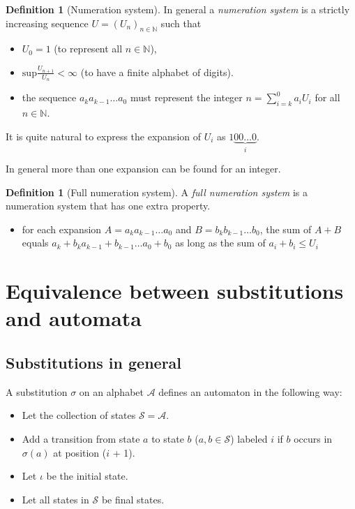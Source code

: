 \documentclass{article}
\theoremstyle{definition}
\newtheorem{definition}[theorem]{Definition}
\begin{document}
\begin{definition}[Numeration system] \label{def:numeration_system}
In general a \emph{numeration system} is a strictly increasing sequence 
$U = (U_n)_{n \in \mathbb{N}}$ such that
\begin{itemize}
\item $U_0 = 1$ (to represent all $n \in \mathbb{N}$),
\item $\mathrm{sup}\frac{U_{n + 1}}{U_n} < \infty$ (to have a finite alphabet 
      of digits).
\item the sequence $a_k a_{k - 1} \ldots a_0$ must represent the integer
$n = \sum_{i = k}^0 a_i U_i$ for all $n \in \mathbb{N}$.
\end{itemize}
\end{definition}

It is quite natural to express the expansion of $U_i$ as
$1\underbrace{00\ldots0}_i$. 

In general more than one expansion can be found for an integer.

\begin{definition}[Full numeration system] \label{def:full_numeration_system}
A \emph{full numeration system} is a numeration system that has one extra
property. 
\begin{itemize}
\item for each expansion $A = a_k a_{k - 1} \ldots a_0$ and 
$B = b_k b_{k - 1} \ldots b_0$, the sum of $A + B$ equals 
$a_k + b_k a_{k - 1} + b_{k - 1} \ldots a_0 + b_0$ as long as the sum of 
$a_i + b_i \le U_i$
\end{itemize}
\end{definition}

\section{Equivalence between substitutions and automata}
\subsection{Substitutions in general}
A substitution $\sigma$ on an alphabet $\mathcal{A}$ defines an automaton in 
the following way:
\begin{itemize}
\item Let the collection of states $\mathcal{S} = \mathcal{A}$.
\item Add a transition from state $a$ to state $b$ ($a,b \in \mathcal{S}$) 
labeled $i$ if $b$ occurs in $\sigma(a)$ at position ($i$ + 1).
\item Let $\iota$ be the initial state.
\item Let all states in $\mathcal{S}$ be final states.
\end{itemize}
\end{document}
